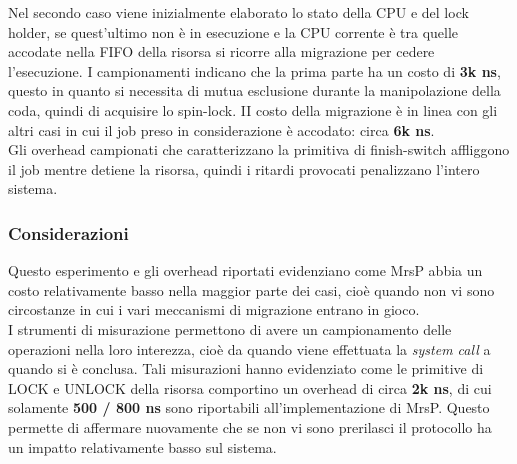 {\noindent Nel secondo caso viene inizialmente elaborato lo stato della CPU e del lock holder, se quest'ultimo non è in esecuzione e la CPU corrente è tra quelle accodate nella FIFO della risorsa si ricorre alla migrazione per cedere l'esecuzione. I campionamenti indicano che la prima parte ha un costo di \textbf{3k ns}, questo in quanto si necessita di mutua esclusione durante la manipolazione della coda, quindi di acquisire lo spin-lock. II costo della migrazione è in linea con gli altri casi in cui il job preso in considerazione è accodato: circa \textbf{6k ns}.\\

\noindent Gli overhead campionati che caratterizzano la primitiva di finish-switch affliggono il job mentre detiene la risorsa, quindi i ritardi provocati penalizzano l'intero sistema.

\subsubsection{Considerazioni}
\label{sec:overhead_cons}

\noindent Questo esperimento e gli overhead riportati evidenziano come MrsP abbia un costo relativamente basso nella maggior parte dei casi, cioè quando non vi sono circostanze in cui i vari meccanismi di migrazione entrano in gioco.\\

\noindent I strumenti di misurazione permettono di avere un campionamento delle operazioni nella loro interezza, cioè da quando viene effettuata la \textit{system call} a quando si è conclusa. Tali misurazioni hanno evidenziato come le primitive di LOCK e UNLOCK della risorsa comportino un overhead di circa \textbf{2k ns}, di cui solamente \textbf{500 / 800 ns} sono riportabili all'implementazione di MrsP. Questo permette di affermare nuovamente che se non vi sono prerilasci il protocollo ha un impatto relativamente basso sul sistema.\\




}
